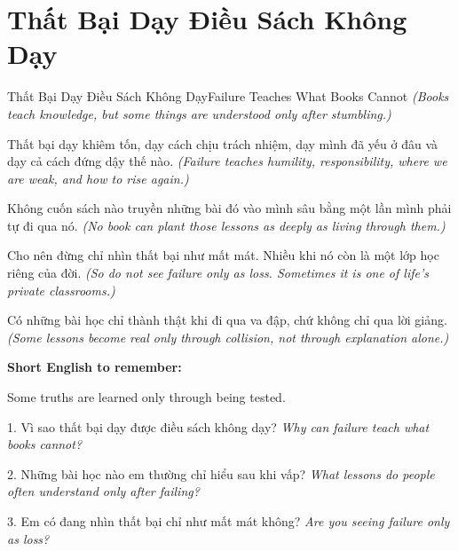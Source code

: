 \section{Thất Bại Dạy Điều Sách Không Dạy}
\begin{truyen}{Thất Bại Dạy Điều Sách Không Dạy}{Failure Teaches What Books Cannot}
\textit{(Books teach knowledge, but some things are understood only after stumbling.)}

Thất bại dạy khiêm tốn, dạy cách chịu trách nhiệm, dạy mình đã yếu ở đâu và dạy cả cách đứng dậy thế nào.
\textit{(Failure teaches humility, responsibility, where we are weak, and how to rise again.)}

Không cuốn sách nào truyền những bài đó vào mình sâu bằng một lần mình phải tự đi qua nó.
\textit{(No book can plant those lessons as deeply as living through them.)}

Cho nên đừng chỉ nhìn thất bại như mất mát. Nhiều khi nó còn là một lớp học riêng của đời.
\textit{(So do not see failure only as loss. Sometimes it is one of life's private classrooms.)}
\end{truyen}

\begin{baihoc}
Có những bài học chỉ thành thật khi đi qua va đập, chứ không chỉ qua lời giảng.
\textit{(Some lessons become real only through collision, not through explanation alone.)}
\end{baihoc}

\begin{ghinhoanh}
\textbf{Short English to remember:}

Some truths are learned only through being tested.

\end{ghinhoanh}

\begin{tuhocnhanh}
1. Vì sao thất bại dạy được điều sách không dạy? \textit{Why can failure teach what books cannot?}

2. Những bài học nào em thường chỉ hiểu sau khi vấp? \textit{What lessons do people often understand only after failing?}

3. Em có đang nhìn thất bại chỉ như mất mát không? \textit{Are you seeing failure only as loss?}
\end{tuhocnhanh}
\ngancach

